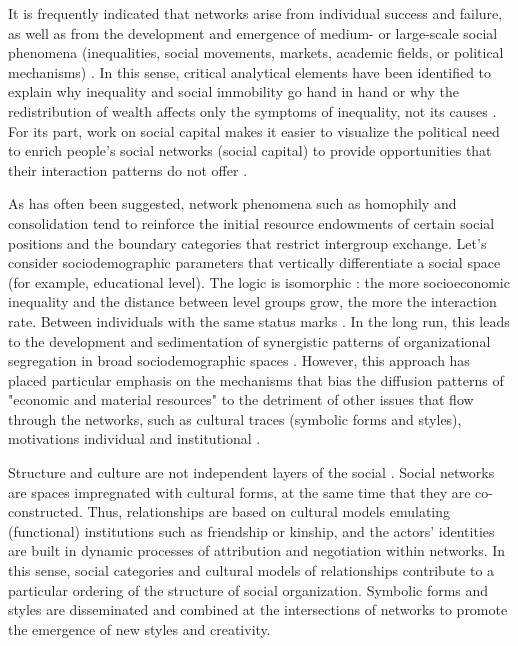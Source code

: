  It is frequently indicated that networks arise from individual success and failure, as well as from the development and emergence of medium- or large-scale social phenomena (inequalities, social movements, markets, academic fields, or political mechanisms) \parencite{blau_macrosociological_1977, gould_origins_2002, granovetter_strength_1973,lin_social_2002,mayhew_structuralism_1980}. In this sense, critical analytical elements have been identified to explain why inequality and social immobility go hand in hand \parencite{tilly_durable_2009} or why the redistribution of wealth affects only the symptoms of inequality, not its causes \parencite{diprete_relevance_2021}. For its part, work on social capital makes it easier to visualize the political need to enrich people's social networks (social capital) to provide opportunities that their interaction patterns do not offer \parencite{jackson_inequalitys_2021, lin_social_2002}.
\bigskip

As has often been suggested, network phenomena such as homophily and consolidation \parencite{dimaggio_how_2011, dimaggio_network_2012,jackson_inequalitys_2021,zhao_network_2021} tend to reinforce the initial resource endowments of certain social positions and the boundary categories that restrict intergroup exchange. Let's consider sociodemographic parameters that vertically differentiate a social space (for example, educational level). The logic is isomorphic \parencite{blau_macrosociological_1977}: the more socioeconomic inequality and the distance between level groups grow, the more the interaction rate. Between individuals with the same status marks \parencite{podolny_status_2008,smith_social_2014,torche_intergenerational_2014}. In the long run, this leads to the development and sedimentation of synergistic patterns of organizational segregation in broad sociodemographic spaces \parencite{mcpherson_blau_2004, tilly_durable_2009}. However, this approach has placed particular emphasis on the mechanisms that bias the diffusion patterns of "economic and material resources" to the detriment of other issues that flow through the networks, such as cultural traces (symbolic forms and styles), motivations individual and institutional \parencite{white_identity_2008}.
\bigskip

Structure and culture are not independent layers of the social \parencite{fuhse_dualities_2010,fuhse_theorizing_2015}. Social networks are spaces impregnated with cultural forms, at the same time that they are co-constructed. Thus, relationships are based on cultural models emulating (functional) institutions such as friendship or kinship, and the actors' identities are built in dynamic processes of attribution and negotiation within networks. In this sense, social categories and cultural models of relationships contribute to a particular ordering of the structure of social organization. Symbolic forms and styles \parencite{white_identity_2008} are disseminated and combined at the intersections of networks to promote the emergence of new styles and creativity.
\bigskip

